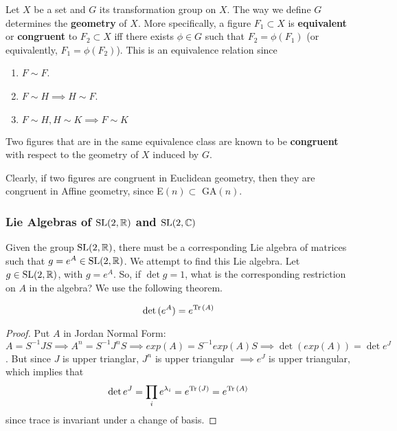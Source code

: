   \begin{definition}
    Let $X$ be a set and $G$ its transformation group on $X$. The way we define $G$ determines the \textbf{geometry} of $X$. More specifically, a figure $F_{1} \subset X$ is \textbf{equivalent} or \textbf{congruent} to $F_{2} \subset X$ iff there exists $\phi \in G$ such that $F_{2} = \phi (F_{1})$ (or equivalently, $F_{1} = \phi (F_{2})$). This is an equivalence relation since
    \begin{enumerate}
      \item $F \sim F$. 
      \item $F \sim H \implies H \sim F$. 
      \item $F \sim H, H \sim K \implies F \sim K$
    \end{enumerate}
    Two figures that are in the same equivalence class are known to be \textbf{congruent} with respect to the geometry of $X$ induced by $G$. 
  \end{definition}

  Clearly, if two figures are congruent in Euclidean geometry, then they are congruent in Affine geometry, since E$(n) \subset$ GA$(n)$. 


\subsubsection[Lie Algebras of SL(2, R) and SL(2, C)]{Lie Algebras of $\operatorname{SL}(2, \mathbb{R})$ and $\operatorname{SL}(2, \mathbb{C})$}

  Given the group $\operatorname{SL}(2, \mathbb{R})$, there must be a corresponding Lie algebra of matrices such that $g = e^A \in \operatorname{SL}(2, \mathbb{R})$. We attempt to find this Lie algebra. Let $g \in \operatorname{SL}(2, \mathbb{R})$, with $g = e^A$. So, if $\det{g} = 1$, what is the corresponding restriction on $A$ in the algebra? We use the following theorem. 

  \begin{theorem}
    \begin{equation}
      \det{(e^A)} = e^{\operatorname{Tr}{(A)}}
    \end{equation}
  \end{theorem}
  \begin{proof}
    Put $A$ in Jordan Normal Form: $A = S^{-1} J S \implies A^n = S^{-1} J^n S \implies exp(A) = S^{-1} exp(A) S \implies \det{(exp(A))} = \det{e^J}$. But since $J$ is upper trianglar, $J^n$ is upper triangular $\implies e^J$ is upper triangular, which implies that 
    \begin{equation}
      \det{e^J} = \prod_i e^{\lambda_i} = e^{\operatorname{Tr}{(J)}} = e^{\operatorname{Tr}{(A)}}
    \end{equation}
    since trace is invariant under a change of basis. 
  \end{proof}

